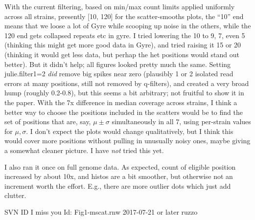 \documentclass{article}\usepackage[]{graphicx}\usepackage[]{color}
\begin{document}
With the current filtering, based on min/max count limits applied uniformly across all strains, presently [10, 120] for the scatter-smooths plots, the ``10'' end means that we loose a lot of Gyre while scooping up noise in the others, while the 120 end gets collapsed repeats etc in gyre.  I tried lowering the 10 to 9, 7, even 5 (thinking this might get more good data in Gyre), and tried raising it 15 or 20 (thinking it would get less data, but perhap the het positions would stand out better).  But it didn't help; all figures looked pretty much the same.  Setting julie.filter1=2 \emph{did} remove big spikes near zero (plausibly 1 or 2 isolated read errors at many positions, still not removed by q-filters), and created a very broad hump (roughly 0.2-0.8), but this seems a bit arbitrary; not fruitful to show it in the paper.   With the 7x difference in median coverage across strains, I think a better way to choose the positions included in the scatters would be to find the set of positions that are, say, $\mu\pm\sigma$ simultaneously in all 7, using per-strain values for $\mu,\sigma$.   I don't expect the plots would change qualitatively, but I think this would cover more positions without pulling in unusually noisy ones, maybe giving a somewhat cleaner picture.  I have \emph{not} tried this yet.

I also ran it once on full genome data.  As expected, count of eligible position increased by about 10x, and histos are a bit smoother, but otherwise not an increment worth the effort.  E.g., there are more outlier dots which just add clutter.


\vfill\footnotesize\flushright SVN ID I miss you $ $Id: Fig1-mscat.rnw 2017-07-21 or later ruzzo $ $
\end{document}

